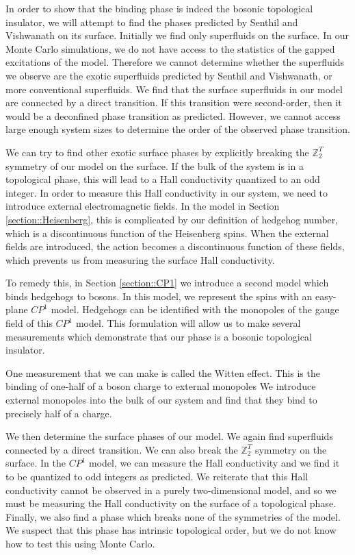 \documentclass[prb,twocolumn]{revtex4-1}
\def\ztwot{\mathbb{Z}_2^T}
\newcommand{\cp}{$CP^1$ }
\begin{document}
In order to show that the binding phase is indeed the bosonic topological insulator, we will attempt to find the phases predicted by Senthil and Vishwanath on its surface. Initially we find only superfluids on the surface. In our Monte Carlo simulations, we do not have access to the statistics of the gapped excitations of the model. Therefore we cannot determine whether the superfluids we observe are the exotic superfluids predicted by Senthil and Vishwanath, or more conventional superfluids. We find that the surface superfluids in our model are connected by a direct transition. If this transition were second-order, then it would be a deconfined phase transition as predicted. However, we cannot access large enough system sizes to determine the order of the observed phase transition. 

We can try to find other exotic surface phases by explicitly breaking the $\ztwot$ symmetry of our model on the surface. If the bulk of the system is in a topological phase, this will lead to a Hall conductivity quantized to an odd integer. In order to measure this Hall conductivity in our system, we need to introduce external electromagnetic fields. In the model in Section \ref{section::Heisenberg}, this is complicated by our definition of hedgehog number, which is a discontinuous function of the Heisenberg spins. When the external fields are introduced, the action becomes a discontinuous function of these fields, which prevents us from measuring the surface Hall conductivity.

To remedy this, in Section \ref{section::CP1} we introduce a second model which binds hedgehogs to bosons. In this model, we represent the spins with an easy-plane \cp model.
Hedgehogs can be identified with the monopoles of the gauge field of this \cp model. This formulation will allow us to make several measurements which demonstrate that our phase is a bosonic topological insulator.

One measurement that we can make is called the Witten effect.\cite{MaxWitten,Max} This is the binding of one-half of a boson charge to external monopoles We introduce external monopoles into the bulk of our system and find that they bind to precisely half of a charge.

We then determine the surface phases of our model. We again find superfluids connected by a direct transition.  We can also break the $\ztwot$ symmetry on the surface. In the \cp model, we can measure the Hall conductivity and we find it to be quantized to odd integers as predicted. We reiterate that this Hall conductivity cannot be observed in a purely two-dimensional model, and so we must be measuring the Hall conductivity on the surface of a topological phase. Finally, we also find a phase which breaks none of the symmetries of the model. We suspect that this phase has intrinsic topological order, but we do not know how to test this using Monte Carlo.
\end{document}
